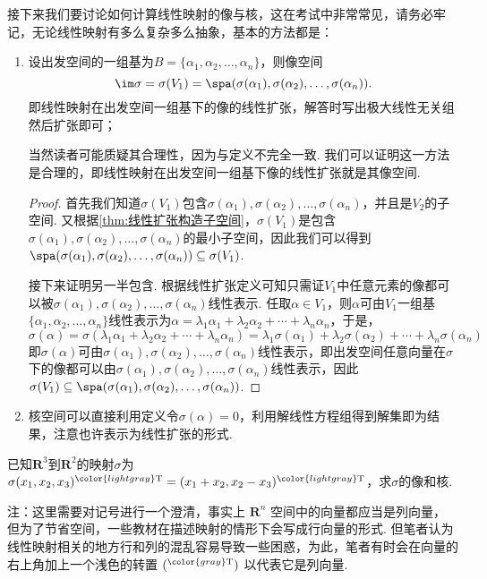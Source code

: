 接下来我们要讨论如何计算线性映射的像与核，这在考试中非常常见，请务必牢记，无论线性映射有多么复杂多么抽象，基本的方法都是：
\begin{enumerate}
    \item 设出发空间的一组基为$B=\{\alpha_1,\alpha_2,\ldots,\alpha_n\}$，则像空间
          \[\im \sigma=\sigma(V_1)=\spa(\sigma(\alpha_1),\sigma(\alpha_2),\ldots,\sigma(\alpha_n)).\]
          即线性映射在出发空间一组基下的像的线性扩张，解答时写出极大线性无关组然后扩张即可；

          当然读者可能质疑其合理性，因为与定义不完全一致. 我们可以证明这一方法是合理的，即线性映射在出发空间一组基下像的线性扩张就是其像空间.

          \begin{proof}
              首先我们知道$\sigma(V_1)$包含$\sigma(\alpha_1),\sigma(\alpha_2),\ldots,\sigma(\alpha_n)$，并且是$V_2$的子空间. 又根据\autoref{thm:线性扩张构造子空间}，$\sigma(V_1)$是包含$\sigma(\alpha_1),\sigma(\alpha_2),\ldots,\sigma(\alpha_n)$的最小子空间，因此我们可以得到$\spa(\sigma(\alpha_1),\sigma(\alpha_2),\ldots,\sigma(\alpha_n))\subseteq\sigma(V_1)$.

              接下来证明另一半包含. 根据线性扩张定义可知只需证$V_1$中任意元素的像都可以被$\sigma(\alpha_1),\sigma(\alpha_2),\ldots,\sigma(\alpha_n)$线性表示. 任取$\alpha\in V_1$，则$\alpha$可由$V_1$一组基$\{\alpha_1,\alpha_2,\ldots,\alpha_n\}$线性表示为$\alpha=\lambda_1\alpha_1+\lambda_2\alpha_2+\cdots+\lambda_n\alpha_n$，于是，
              \[\sigma(\alpha)=\sigma(\lambda_1\alpha_1+\lambda_2\alpha_2+\cdots+\lambda_n\alpha_n)=\lambda_1\sigma(\alpha_1)+\lambda_2\sigma(\alpha_2)+\cdots+\lambda_n\sigma(\alpha_n)\]
              即$\sigma(\alpha)$可由$\sigma(\alpha_1),\sigma(\alpha_2),\ldots,\sigma(\alpha_n)$线性表示，即出发空间任意向量在$\sigma$下的像都可以由$\sigma(\alpha_1),\sigma(\alpha_2),\ldots,\sigma(\alpha_n)$线性表示，因此$\sigma(V_1)\subseteq\spa(\sigma(\alpha_1),\sigma(\alpha_2),\ldots,\sigma(\alpha_n))$.
          \end{proof}

    \item 核空间可以直接利用定义令$\sigma(\alpha)=0$，利用解线性方程组得到解集即为结果，注意也许表示为线性扩张的形式.
\end{enumerate}

\begin{example}{}{}
    已知$\mathbf{R}^3$到$\mathbf{R}^2$的映射$\sigma$为$\sigma(x_1,x_2,x_3)^{\color{lightgray}\mathrm{T}}=(x_1+x_2,x_2-x_3)^{\color{lightgray}\mathrm{T}}$，求$\sigma$的像和核.
\end{example}
注：这里需要对记号进行一个澄清，事实上 $\mathbf{R}^n$ 空间中的向量都应当是列向量，但为了节省空间，一些教材在描述映射的情形下会写成行向量的形式. 但笔者认为线性映射相关的地方行和列的混乱容易导致一些困惑，为此，笔者有时会在向量的右上角加上一个浅色的转置 $({}^{\color{gray}\mathrm{T}})$ 以代表它是列向量.

